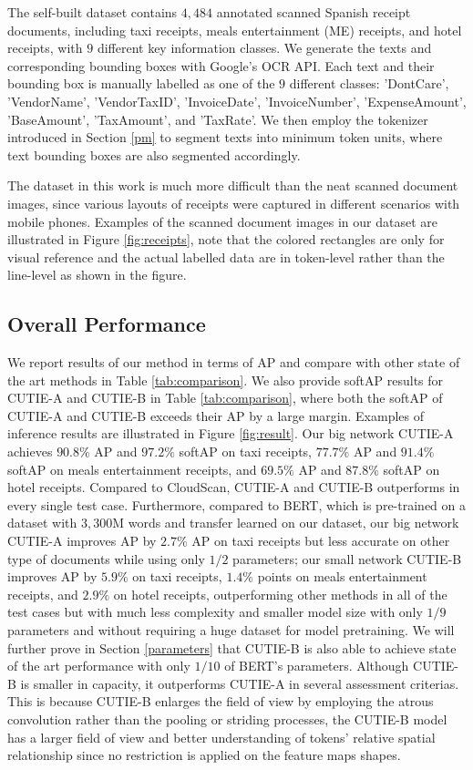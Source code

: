 \documentclass[10pt,twocolumn,letterpaper]{article}
\begin{document}
The self-built dataset contains $4,484$ annotated scanned Spanish receipt documents, including taxi receipts, meals entertainment (ME) receipts, and hotel receipts, with $9$ different key information classes. We generate the texts and corresponding bounding boxes with Google's OCR API. Each text and their bounding box is manually labelled as one of the $9$ different classes: 'DontCare', 'VendorName', 'VendorTaxID', 'InvoiceDate', 'InvoiceNumber', 'ExpenseAmount', 'BaseAmount', 'TaxAmount', and 'TaxRate'. We then employ the tokenizer introduced in Section \ref{pm} to segment texts into minimum token units, where text bounding boxes are also segmented accordingly. 

The dataset in this work is much more difficult than the neat scanned document images, since various layouts of receipts were captured in different scenarios with mobile phones. Examples of the scanned document images in our dataset are illustrated in Figure \ref{fig:receipts}, note that the colored rectangles are only for visual reference and the actual labelled data are in token-level rather than the line-level as shown in the figure.

\subsection{Overall Performance}
We report results of our method in terms of AP and compare with other state of the art methods in Table \ref{tab:comparison}. We also provide softAP results for CUTIE-A and CUTIE-B in Table \ref{tab:comparison}, where both the softAP of CUTIE-A and CUTIE-B exceeds their AP by a large margin.  Examples of inference results are illustrated in Figure \ref{fig:result}. Our big network CUTIE-A achieves $90.8\%$ AP and $97.2\%$ softAP on taxi receipts, $77.7\%$ AP and $91.4\%$ softAP on meals entertainment receipts, and $69.5\%$ AP and $87.8\%$ softAP on hotel receipts. Compared to CloudScan, CUTIE-A and CUTIE-B outperforms in every single test case. Furthermore, compared to BERT, which is pre-trained on a dataset with $3,300$M words and transfer learned on our dataset, our big network CUTIE-A improves AP by $2.7\%$ AP on taxi receipts but less accurate on other type of documents while using only $1/2$ parameters; our small network CUTIE-B improves AP by $5.9\%$ on taxi receipts, $1.4\%$ points on meals entertainment receipts, and $2.9\%$ on hotel receipts, outperforming other methods in all of the test cases but with much less complexity and smaller model size with only $1/9$ parameters and without requiring a huge dataset for model pretraining. We will further prove in Section \ref{parameters} that CUTIE-B is also able to achieve state of the art performance with only $1/10$ of BERT's parameters. Although CUTIE-B is smaller in capacity, it outperforms CUTIE-A in several assessment criterias. This is because CUTIE-B enlarges the field of view by employing the atrous convolution rather than the pooling or striding processes, the CUTIE-B model has a larger field of view and better understanding of tokens' relative spatial relationship since no restriction is applied on the feature maps shapes. 
\end{document}
